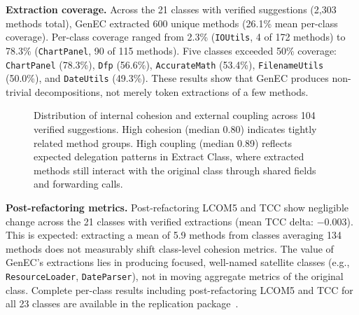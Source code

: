 \documentclass[sigconf]{acmart}
\begin{document}
\textbf{Extraction coverage.}  Across the 21 classes with verified suggestions
(2,303 methods total), GenEC extracted 600 unique methods (26.1\% mean
per-class coverage). Per-class coverage ranged from 2.3\% (\texttt{IOUtils}, 4
of 172 methods) to 78.3\% (\texttt{ChartPanel}, 90 of 115 methods).
Five classes exceeded 50\% coverage: \texttt{ChartPanel} (78.3\%),
\texttt{Dfp} (56.6\%), \texttt{AccurateMath} (53.4\%), \texttt{FilenameUtils}
(50.0\%), and \texttt{DateUtils} (49.3\%). These results show that GenEC
produces non-trivial decompositions, not merely token extractions of a few
methods.

\begin{figure}[t]
\centering
{}
\caption{Distribution of internal cohesion and external coupling across 104
verified suggestions. High cohesion (median 0.80) indicates tightly related
method groups. High coupling (median 0.89) reflects expected delegation
patterns in Extract Class, where extracted methods still interact with the
original class through shared fields and forwarding calls.}
\label{fig:cohesion-coupling}
\end{figure}

\textbf{Post-refactoring metrics.}  Post-refactoring LCOM5 and TCC show
negligible change across the 21 classes with verified extractions (mean TCC
delta: $-0.003$). This is expected: extracting a mean of 5.9 methods from
classes averaging 134 methods does not measurably shift class-level cohesion
metrics. The value of GenEC's extractions lies in producing focused,
well-named satellite classes (e.g., \texttt{ResourceLoader},
\texttt{DateParser}), not in moving aggregate metrics of the original class.
Complete per-class results including post-refactoring LCOM5 and TCC for all 23
classes are available in the replication package~\cite{Tomar2025GenEC}.
\end{document}
